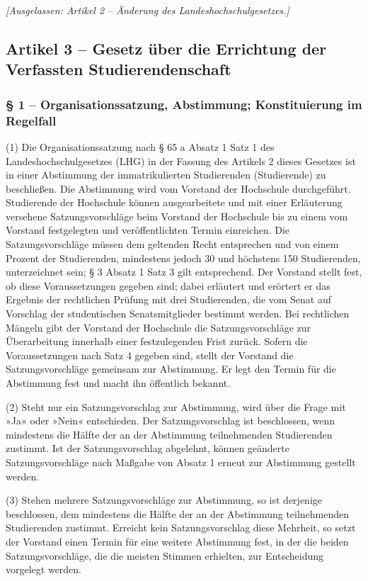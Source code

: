 \documentclass[
10pt,
a4paper,
twoside,								%
titlepage=false,							%
draft=false								%
]{scrartcl}
\begin{document}
\bigskip
\emph{[Ausgelassen: Artikel 2 – Änderung des Landeshochschulgesetzes.]}


\subsection{Artikel 3 – Gesetz über die Errichtung der Verfassten Studierendenschaft}

\subsubsection*{§ 1 – Organisationssatzung, Abstimmung; Konstituierung im Regelfall}

(1) Die Organisationssatzung nach § 65 a Absatz 1 Satz 1 des Landeshochschulgesetzes (LHG) in der Fassung des Artikels 2 dieses Gesetzes ist in einer Abstimmung der immatrikulierten Studierenden (Studierende) zu beschließen. Die Abstimmung wird vom Vorstand der Hochschule durchgeführt. Studierende der Hochschule können ausgearbeitete und mit einer Erläuterung versehene Satzungsvorschläge beim Vorstand der Hochschule bis zu einem vom Vorstand festgelegten und veröffentlichten Termin einreichen. Die Satzungsvorschläge müssen dem geltenden Recht entsprechen und von einem Prozent der Studierenden, mindestens jedoch 30 und höchstens 150 Studierenden, unterzeichnet sein; § 3 Absatz 1 Satz 3 gilt entsprechend. Der Vorstand stellt fest, ob diese Voraussetzungen gegeben sind; dabei erläutert und erörtert er das Ergebnis der rechtlichen Prüfung mit drei Studierenden, die vom Senat auf Vorschlag der studentischen Senatsmitglieder bestimmt werden. Bei rechtlichen Mängeln gibt der Vorstand der Hochschule die Satzungsvorschläge zur Überarbeitung innerhalb einer festzulegenden Frist zurück. Sofern die Voraussetzungen nach Satz 4 gegeben sind, stellt der Vorstand die Satzungsvorschläge gemeinsam zur Abstimmung. Er legt den Termin für die Abstimmung fest und macht ihn öffentlich bekannt.

(2) Steht nur ein Satzungsvorschlag zur Abstimmung, wird über die Frage mit »Ja« oder »Nein« entschieden. Der Satzungsvorschlag ist beschlossen, wenn mindestens die Hälfte der an der Abstimmung teilnehmenden Studierenden zustimmt. Ist der Satzungsvorschlag abgelehnt, können geänderte Satzungsvorschläge nach Maßgabe von Absatz 1 erneut zur Abstimmung gestellt werden.

(3) Stehen mehrere Satzungsvorschläge zur Abstimmung, so ist derjenige beschlossen, dem mindestens die Hälfte der an der Abstimmung teilnehmenden Studierenden zustimmt. Erreicht kein Satzungsvorschlag diese Mehrheit, so setzt der Vorstand einen Termin für eine weitere Abstimmung fest, in der die beiden Satzungsvorschläge, die die meisten Stimmen erhielten, zur Entscheidung vorgelegt werden.
\end{document}
